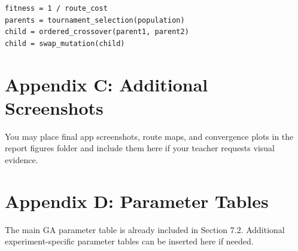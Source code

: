 \begin{verbatim}
fitness = 1 / route_cost
parents = tournament_selection(population)
child = ordered_crossover(parent1, parent2)
child = swap_mutation(child)
\end{verbatim}

\section{Appendix C: Additional Screenshots}
You may place final app screenshots, route maps, and convergence plots in the report figures folder and include them here if your teacher requests visual evidence.

\section{Appendix D: Parameter Tables}
The main GA parameter table is already included in Section 7.2. Additional experiment-specific parameter tables can be inserted here if needed.
